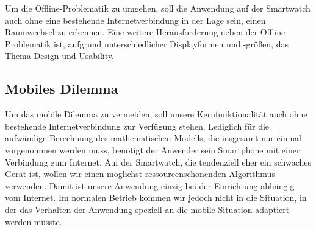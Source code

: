 Um die Offline-Problematik zu umgehen, soll die Anwendung auf der Smartwatch auch ohne eine bestehende Internetverbindung in der Lage sein, einen Raumwechsel zu erkennen. Eine weitere Herausforderung neben der Offline-Problematik ist, aufgrund unterschiedlicher Displayformen und -größen, das Thema Design und Usability.

\subsection{Mobiles Dilemma}
Um das mobile Dilemma zu vermeiden, soll unsere Kernfunktionalität auch ohne bestehende Internetverbindung zur Verfügung stehen. Lediglich für die aufwändige Berechnung des mathematischen Modells, die insgesamt nur einmal vorgenommen werden muss, benötigt der Anwender sein Smartphone mit einer Verbindung zum Internet. Auf der Smartwatch, die tendenziell eher ein schwaches Gerät ist, wollen wir einen möglichst ressourcenschonenden Algorithmus verwenden. Damit ist unsere Anwendung einzig bei der Einrichtung abhängig vom Internet. Im normalen Betrieb kommen wir jedoch nicht in die Situation, in der das Verhalten der Anwendung speziell an die mobile Situation adaptiert werden müsste.


